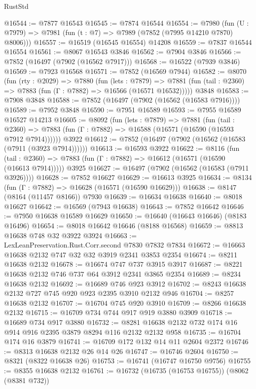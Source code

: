 \begin{lexlean}{RustStd}
\begin{coremodule}
@16544 := @7877 @16543
@16545 := @7874 @16544
@16554 := @7980
    (fun (U : @7979) => @7981 (fun (t : @7) => @7989 (@7852 (@7995 @14210 @7870) @8006)))
@16557 := @16519 (@16545 @16554) @14208
@16559 := @7837 @16544 @16554
@16561 := @8067 @16543 @3846
@16562 := @7904 @3846
@16566 := @7852 (@16497 (@7902 (@16562 @7917)))
@16568 := @16522 (@7939 @3846)
@16569 := @7923 @16568
@16571 := @7852 (@16569 @7944)
@16582 := @8070
    (fun (rty : @2029) =>
    @7880
      (fun (lets : @7879) =>
      @7881 (fun (tail : @2360) => @7883 (fun (Γ : @7882) => @16566 (@16571 @16532)))))
    @3848
@16583 := @7908 @3848
@16588 := @7852 (@16497 (@7902 (@16562 (@16583 @7916))))
@16589 := @7952 @3848
@16590 := @7951 @16589
@16593 := @7955 @16589 @16527 @14213
@16605 := @8092
    (fun (lets : @7879) =>
    @7881
      (fun (tail : @2360) =>
      @7883 (fun (Γ : @7882) => @16588 (@16571 (@16590 (@16593 @7912 @7914))))))
    @3922
@16612 := @7852 (@16497 (@7902 (@16562 (@16583 (@7911 (@3923 @7914))))))
@16613 := @16593 @3922
@16622 := @8116
    (fun (tail : @2360) => @7883 (fun (Γ : @7882) => @16612 (@16571 (@16590 (@16613 @7914)))))
    @3925
@16627 := @16497 (@7902 (@16562 (@16583 (@7911 @3926))))
@16628 := @7852 @16627
@16629 := @16613 @3925
@16634 := @8134 (fun (Γ : @7882) => @16628 (@16571 (@16590 @16629)))
@16638 := @8147 (@8164 (@11457 @8166)) @7930
@16639 := @16634 @16638
@16640 := @8018 @16627
@16642 := @16569 (@7943 @16638)
@16643 := @7852 @16642
@16646 := @7950 @16638 @16589 @16629
@16650 := @16640 (@16643 @16646) (@8183 @16496)
@16654 := @8018 @16642 @16646 (@8188 @16568)
@16659 := @8813 @16638 @748 @32 @3922 @3924
@16663 := LexLeanPreservation.Rust.Corr.second @7830 @7832 @7834
@16672 := @16663 @16638 @2132 @747 @32 @32 @3919 @2341 @3853 @2354
@16674 := @8211 @16638 @2132
@16678 := @16674 @747 @737 @3915 @3917
@16687 := @8221 @16638 @2132 @746 @737 @64 @3912 @2341 @3865 @2354
@16689 := @8234 @16638 @2132
@16692 := @16689 @746 @923 @3912
@16702 := @8243 @16638 @2132 @727 @745 @920 @923 @2395 @3910 @2132 @946
@16704 := @8257 @16638 @2132
@16707 := @16704 @745 @920 @3910
@16709 := @8266 @16638 @2132
@16715 := @16709 @734 @744 @917 @919 @3880 @3909
@16718 := @16689 @734 @917 @3880
@16732 := @8281 @16638 @2132 @732 @174 @16 @914 @916 @2395 @3879 @8294 @116 @2132 @2132 @958
@16735 := @16704 @174 @16 @3879
@16741 := @16709 @172 @132 @14 @11 @2604 @2372
@16746 := @8313 @16638 @2132 @26 @14 @26
@16747 := @16746 @2604
@16750 := @8321 (@8322 @16638 @26)
@16753 := @16741 (@16747 @16750 @9756)
@16755 := @8355 @16638 @2132
@16761 := @16732 (@16735 (@16753 @16755)) (@8062 (@8381 @732))

\end{coremodule}
\end{lexlean}
